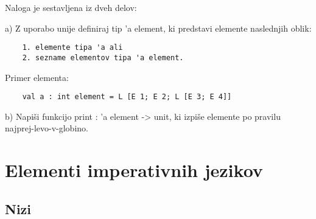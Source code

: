 \begin{ex}Naloga je sestavljena iz dveh delov:

a) Z uporabo unije definiraj tip 'a element, ki predstavi elemente naslednjih oblik:
\begin{lstlisting}
    1. elemente tipa 'a ali
    2. sezname elementov tipa 'a element.
\end{lstlisting}
    Primer elementa: 
\begin{lstlisting}
    val a : int element = L [E 1; E 2; L [E 3; E 4]]
\end{lstlisting}

b) Napi\v si funkcijo print : 'a element -> unit, ki izpi\v se elemente po pravilu                          
    najprej-levo-v-globino.



\end{ex} 

\chapter{Elementi imperativnih jezikov}

\section{Nizi}

